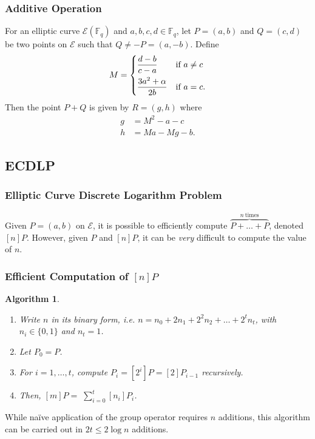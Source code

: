 \documentclass{beamer}
\newtheorem{algorithm}{Algorithm}
\begin{document}
    \begin{frame}
        \frametitle{Additive Operation}
        \begin{theorem}
            For an elliptic curve \(\mathcal{E}(\mathbb{F}_q)\)
            and \(a, b, c, d \in \mathbb{F}_q\),
            let \(P = (a, b)\) and \(Q = (c, d)\) be two points
            on \(\mathcal{E}\) such that \(Q \neq -P = (a, -b)\). Define
            \[M = 
                \begin{dcases}
                    \frac{d - b}{c - a} & \textnormal{if}\ a \neq c \\
                    \frac{3a^2 + \alpha}{2b} & \textnormal{if}\ a = c.
                \end{dcases}\]
            Then the point \(P + Q\) is given by \(R = (g, h)\) where
            \begin{align*}
                g &= M^2 - a - c \\
                h &= Ma - Mg - b.
            \end{align*}
        \end{theorem}
    \end{frame}

    \subsection{ECDLP}
    \begin{frame}
        \frametitle{Elliptic Curve Discrete Logarithm Problem}
        Given \(P = (a, b)\) on \(\mathcal{E}\), it is possible to
        efficiently compute \(\overbrace{P + \dots + P}^{n\ \textrm{times}}\),
        denoted \([n]P\).
        \vfill
        However, given \(P\) and \([n]P\), it can be \emph{very} difficult to
        compute the value of \(n\).
    \end{frame}

    \begin{frame}
        \frametitle{Efficient Computation of \([n]P\)}
        \begin{algorithm}
            \begin{enumerate}
                \item Write \(n\) in its binary form, i.e.
                    \(n = n_0 + 2n_1 + 2^2n_2 + \dots + 2^tn_t\),
                    with \(n_i \in \{0, 1\}\) and \(n_t = 1\).
                \item Let \(P_0 = P\).
                \item For \(i = 1, \dots, t\), compute \(P_i = [2^i]P =
                    [2]P_{i - 1}\) recursively.
                \item Then, \([m]P =\sum _{i = 0} ^t [n_i]P_i\).
            \end{enumerate}
        \end{algorithm}
        \vfill
        While na\"{i}ve application of the group operator
        requires \(n\) additions, this algorithm can be carried out
        in \(2t \leq 2 \log n\) additions.
    \end{frame} %
\end{document}
